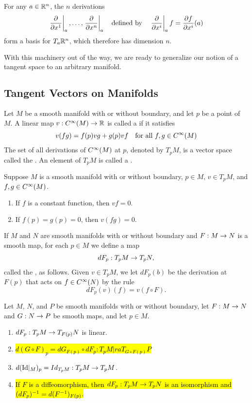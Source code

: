 \begin{cor}
For any $a\in \mathbb{R}^n$, the $n$ derivations
\[\left. \frac{\partial}{\partial x^1}\right|_{a},\ldots, \left. \frac{\partial}{\partial x^n}\right|_{a}\quad\text{defined by}\quad \left. \frac{\partial}{\partial x^i}\right|_{a}f = \frac{\partial{f}}{\partial{x^i}}(a)\]
form a basis for $T_a\mathbb{R}^n$, which therefore has dimension $n$.
\end{cor}

With this machinery out of the way, we are ready to generalize our notion of a tangent space to an arbitrary manifold.

\newpage

\subsection{Tangent Vectors on Manifolds}\nl

\dfn Let $M$ be a smooth manifold with or without boundary, and let $p$ be a point of $M$. A linear map $v:C^\infty(M)\rightarrow \mathbb{R}$ is called a  if it satisfies
\[v(fg) = f(p)vg + g(p)vf\quad\text{for all }f,g\in C^\infty(M)\]
The set of all derivations of $C^\infty(M)$ at $p$, denoted by $T_pM$, is a vector space called the . An element of $T_pM$ is called a .

\begin{lem}
Suppose $M$ is a smooth manifold with or without boundary, $p\in M$, $v\in T_pM$, and $f,g\in C^\infty(M)$.
\begin{enumerate}
    \item If $f$ is a constant function, then $vf = 0$.
    \item If $f(p) = g(p) = 0$, then $v(fg) = 0$.
\end{enumerate}
\end{lem}

\dfn If $M$ and $N$ are smooth manifolds with or without boundary and $F:M\rightarrow N$ is a smooth map, for each $p\in M$ we define a map
\[dF_p:T_pM\rightarrow T_pN,\]
called the , as follows. Given $v\in T_pM$, we let $dF_p(b)$ be the derivation at $F(p)$ that acts on $f\in C^\infty(N)$ by the rule
\[dF_p(v)(f) = v(f\circ F).\]

\setcounter{thm}{5}

\begin{prop}
Let $M,\,N$, and $P$ be smooth manifolds with or without boundary, let $F:M\rightarrow N$ and $G:N\rightarrow P$ be smooth maps, and let $p\in M$.
\begin{enumerate}
    \item $dF_p:T_pM\rightarrow T_{F(p)}N$ is linear.
    \item \hl{$d(G\circ F)_p = dG_{F(p)}\circ dF_p:T_pM|raT_{G\circ F(p)}P$}
    \item $d(\text{Id}|_M)_p = Id_{T_pM}:T_pM\rightarrow T_pM$.
    \item \hl{If $F$ is a diffeomorphism, then $dF_p:T_pM\rightarrow T_pN$ is an isomorphism and $(dF_p)^{-1} = d(F^{-1})_{F(p)}$.}
\end{enumerate}
\end{prop}


